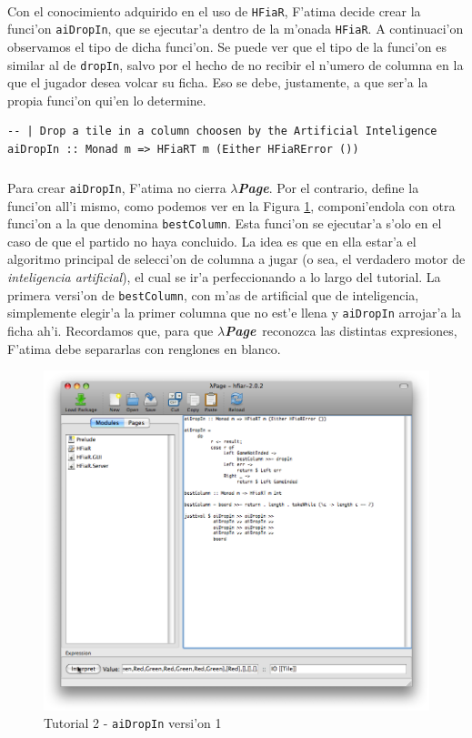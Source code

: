 \documentclass[a4paper]{article}
\newcommand{\hpage}{\textbf{\textsl{$\lambda$Page}}}
\begin{document}
\paragraph{}Con el conocimiento adquirido en el uso de \texttt{HFiaR}, F'atima decide crear la funci'on \texttt{aiDropIn}, que se ejecutar'a dentro de la m'onada \texttt{HFiaR}.  A continuaci'on observamos el tipo de dicha funci'on.  Se puede ver que el tipo de la funci'on es similar al de \texttt{dropIn}, salvo por el hecho de no recibir el n'umero de columna en la que el jugador desea volcar su ficha.  Eso se debe, justamente, a que ser'a la propia funci'on qui'en lo determine.
\begin{center}\begin{lstlisting}
-- | Drop a tile in a column choosen by the Artificial Inteligence
aiDropIn :: Monad m => HFiaRT m (Either HFiaRError ())
\end{lstlisting}\end{center}
\subparagraph{}Para crear \texttt{aiDropIn}, F'atima no cierra \hpage.  Por el contrario, define la funci'on all'i mismo, como podemos ver en la Figura \ref{tut207}, componi'endola con otra funci'on a la que denomina \texttt{bestColumn}.  Esta funci'on se ejecutar'a s'olo en el caso de que el partido no haya concluido.  La idea es que en ella estar'a el algoritmo principal de selecci'on de columna a jugar (o sea, el verdadero motor de \textsl{inteligencia artificial}), el cual se ir'a perfeccionando a lo largo del tutorial.  La primera versi'on de \texttt{bestColumn}, con m'as de artificial que de inteligencia, simplemente elegir'a la primer columna que no est'e llena y \texttt{aiDropIn} arrojar'a la ficha ah'i.  Recordamos que, para que \hpage\ reconozca las distintas expresiones, F'atima debe separarlas con renglones en blanco.
\begin{figure}[hp]
	\begin{center}
        	\includegraphics[width=.75\textwidth]{pictures/tut2/06}
		\caption{Tutorial 2 - \texttt{aiDropIn} versi'on 1}
		\label{tut207}
	\end{center}
\end{figure}
\end{document}
